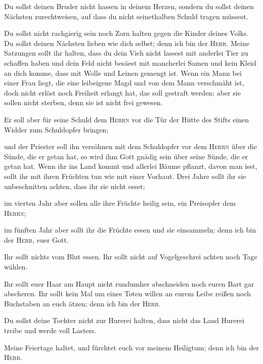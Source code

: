  Du sollst deinen Bruder nicht hassen in deinem Herzen,
sondern du sollst deinen Nächsten zurechtweisen, auf dass du nicht
seinethalben Schuld tragen müssest.

 Du sollst nicht rachgierig sein noch Zorn halten gegen
die Kinder deines Volks. Du sollst deinen Nächsten lieben wie dich
selbst; denn ich bin der \textsc{Herr}.  Meine Satzungen
sollt ihr halten, dass du dein Vieh nicht lassest mit anderlei Tier zu
schaffen haben und dein Feld nicht besäest mit mancherlei Samen und kein
Kleid an dich komme, dass mit Wolle und Leinen gemengt ist.
 Wenn ein Mann bei einer Frau liegt, die eine leibeigene
Magd und von dem Mann verschmäht ist, doch nicht erlöst noch Freiheit
erlangt hat, das soll gestraft werden; aber sie sollen nicht sterben,
denn sie ist nicht frei gewesen.

 Er soll aber für seine Schuld dem \textsc{Herrn} vor die
Tür der Hütte des Stifts einen Widder zum Schuldopfer bringen;

 und der Priester soll ihn versöhnen mit dem Schuldopfer
vor dem \textsc{Herrn} über die Sünde, die er getan hat, so wird ihm
Gott gnädig sein über seine Sünde, die er getan hat. 
Wenn ihr ins Land kommt und allerlei Bäume pflanzt, davon man isst,
sollt ihr mit ihren Früchten tun wie mit einer Vorhaut. Drei Jahre sollt
ihr sie unbeschnitten achten, dass ihr sie nicht esset;

 im vierten Jahr aber sollen alle ihre Früchte heilig
sein, ein Preisopfer dem \textsc{Herrn};

 im fünften Jahr aber sollt ihr die Früchte essen und sie
einsammeln; denn ich bin der \textsc{Herr}, euer Gott.

 Ihr sollt nichts vom Blut essen. Ihr sollt nicht auf
Vogelgeschrei achten noch Tage wählen.

 Ihr sollt euer Haar am Haupt nicht rundumher abschneiden
noch euren Bart gar abscheren.  Ihr sollt kein Mal um
eines Toten willen an eurem Leibe reißen noch Buchstaben an euch ätzen;
denn ich bin der \textsc{Herr}.

 Du sollst deine Tochter nicht zur Hurerei halten, dass
nicht das Land Hurerei treibe und werde voll Lasters.

 Meine Feiertage haltet, und fürchtet euch vor meinem
Heiligtum; denn ich bin der \textsc{Herr}.

